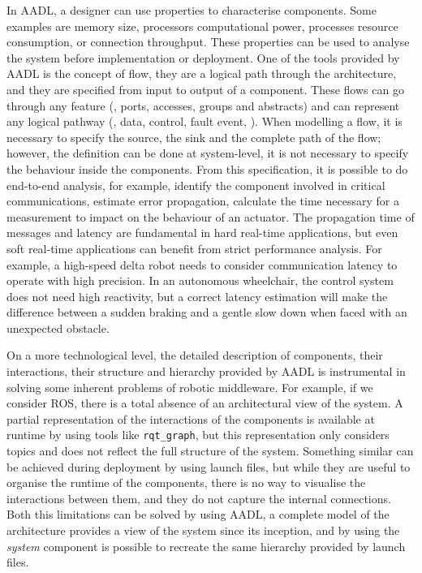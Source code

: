 In AADL, a designer can use properties to characterise components. Some examples are memory size, processors computational power, processes resource consumption, or connection throughput. These properties can be used to analyse the system before implementation or deployment. One of the tools provided by AADL is the concept of flow, they are a logical path through the architecture, and they are specified from input to output of a component. These flows can go through any feature (\ie, ports, accesses, groups and abstracts) and can represent any logical pathway (\eg, data, control, fault event, \etc). When modelling a flow, it is necessary to specify the source, the sink and the complete path of the flow; however, the definition can be done at system-level, it is not necessary to specify the behaviour inside the components. From this specification, it is possible to do end-to-end analysis, for example, identify the component involved in critical communications, estimate error propagation, calculate the time necessary for a measurement to impact on the behaviour of an actuator. The propagation time of messages and latency are fundamental in hard real-time applications, but even soft real-time applications can benefit from strict performance analysis. For example, a high-speed delta robot needs to consider communication latency to operate with high precision. In an autonomous wheelchair, the control system does not need high reactivity, but a correct latency estimation  will make the difference between a sudden braking and a gentle slow down when faced with an unexpected obstacle.

On a more technological level, the detailed description of components, their interactions, their structure and hierarchy provided by AADL is instrumental in solving some inherent problems of robotic middleware. For example, if we consider ROS, there is a total absence of an architectural view of the system. A partial representation of the interactions of the components is available at runtime by using tools like \texttt{rqt\_graph}, but this representation only considers topics and does not reflect the full structure of the system. Something similar can be achieved during deployment by using launch files, but while they are useful to organise the runtime of the components, there is no way to visualise the interactions between them, and they do not capture the internal connections. Both this limitations can be solved by using AADL, a complete model of the architecture provides a view of the system since its inception, and by using the \textit{system} component is possible to recreate the same hierarchy provided by launch files.

